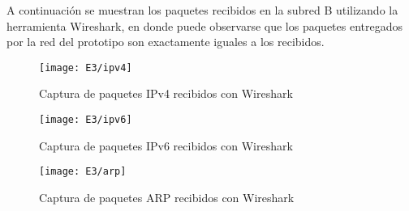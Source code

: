 A continuaci\'on se muestran los paquetes recibidos en la subred B utilizando la herramienta Wireshark, en donde puede observarse que los paquetes entregados por la red del prototipo son exactamente iguales a los recibidos.

\begin{figure}[h!] 
\centering    
\texttt{[image: E3/ipv4]}
\caption[Captura de paquetes IPv4 recibidos con Wireshark]{Captura de paquetes IPv4 recibidos con Wireshark}
\label{fig:CapturaTCP}
\end{figure}

\newpage
\begin{figure}[ht!] 
\centering    
\texttt{[image: E3/ipv6]}
\caption[Captura de paquetes IPv6 recibidos con Wireshark]{Captura de paquetes IPv6 recibidos con Wireshark}
\label{fig:CapturaTCP}
\end{figure}

\begin{figure}[h!] 
\centering    
\texttt{[image: E3/arp]}
\caption[Captura de paquetes ARP recibidos con Wireshark]{Captura de paquetes ARP recibidos con Wireshark}
\label{fig:CapturaTCP}
\end{figure}